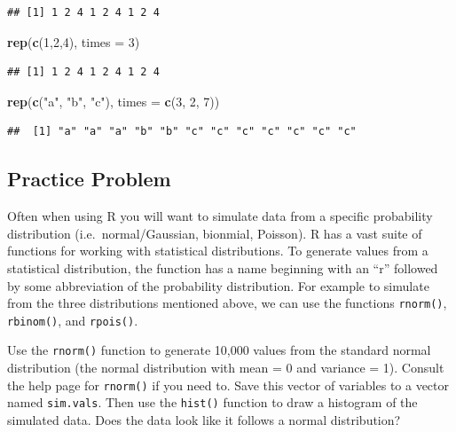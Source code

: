 \documentclass[
]{krantz}
\newenvironment{Shaded}{\begin{snugshade}}{\end{snugshade}}
\newcommand{\DataTypeTok}[1]{\textcolor[rgb]{0.13,0.29,0.53}{#1}}
\newcommand{\DecValTok}[1]{\textcolor[rgb]{0.00,0.00,0.81}{#1}}
\newcommand{\KeywordTok}[1]{\textcolor[rgb]{0.13,0.29,0.53}{\textbf{#1}}}
\newcommand{\NormalTok}[1]{#1}
\newcommand{\StringTok}[1]{\textcolor[rgb]{0.31,0.60,0.02}{#1}}
\begin{document}
\begin{verbatim}
## [1] 1 2 4 1 2 4 1 2 4
\end{verbatim}

\begin{Shaded}
\begin{Highlighting}[]
\KeywordTok{rep}\NormalTok{(}\KeywordTok{c}\NormalTok{(}\DecValTok{1}\NormalTok{,}\DecValTok{2}\NormalTok{,}\DecValTok{4}\NormalTok{), }\DataTypeTok{times =} \DecValTok{3}\NormalTok{)}
\end{Highlighting}
\end{Shaded}

\begin{verbatim}
## [1] 1 2 4 1 2 4 1 2 4
\end{verbatim}

\begin{Shaded}
\begin{Highlighting}[]
\KeywordTok{rep}\NormalTok{(}\KeywordTok{c}\NormalTok{(}\StringTok{"a"}\NormalTok{, }\StringTok{"b"}\NormalTok{, }\StringTok{"c"}\NormalTok{), }\DataTypeTok{times =} \KeywordTok{c}\NormalTok{(}\DecValTok{3}\NormalTok{, }\DecValTok{2}\NormalTok{, }\DecValTok{7}\NormalTok{))}
\end{Highlighting}
\end{Shaded}

\begin{verbatim}
##  [1] "a" "a" "a" "b" "b" "c" "c" "c" "c" "c" "c" "c"
\end{verbatim}

\hypertarget{ch4PP3}{%
\subsection{Practice Problem}\label{ch4PP3}}

Often when using R you will want to simulate data from a specific probability distribution (i.e.~normal/Gaussian, bionmial, Poisson). R has a vast suite of functions for working with statistical distributions. To generate values from a statistical distribution, the function has a name beginning with an ``r'' followed by some abbreviation of the probability distribution. For example to simulate from the three distributions mentioned above, we can use the functions \texttt{rnorm()}, \texttt{rbinom()}, and \texttt{rpois()}.

Use the \texttt{rnorm()} function to generate 10,000 values from the standard normal distribution (the normal distribution with mean = 0 and variance = 1). Consult the help page for \texttt{rnorm()} if you need to. Save this vector of variables to a vector named \texttt{sim.vals}. Then use the \texttt{hist()} function to draw a histogram of the simulated data. Does the data look like it follows a normal distribution?
\end{document}
